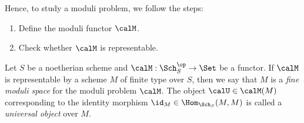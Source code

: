 




    Hence, to study a moduli problem, we follow the steps:
    \begin{enumerate}[label=\arabic*.]
        \item Define the moduli functor \(\calM\).
        \item Check whether \(\calM\) is representable.
    \end{enumerate}

    \begin{definition}\label{def:fine_moduli_space}
        Let \(S\) be a noetherian scheme and \(\calM: \Sch_{S}^{\op} \to \Set\) be a functor.
        If \(\calM\) is representable by a scheme \(M\) of finite type over \(S\), then we say that \(M\) is a \emph{fine moduli space} for the moduli problem \(\calM\).
        The object \(\calU \in \calM(M)\) corresponding to the identity morphism \(\id_M \in \Hom_{\Sch_{S}}(M, M)\) is called a \emph{universal object} over \(M\).
    \end{definition}

